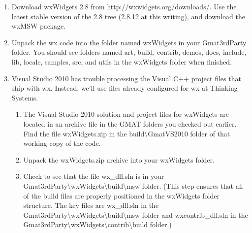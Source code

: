 \documentclass[letterpaper,10pt]{article}%
\begin{document}
\begin{enumerate}
\item Download wxWidgets 2.8 from http://wxwidgets.org/downloads/.  Use the latest stable version of the 2.8 tree (2.8.12 at this writing), and download the wxMSW package.
\item Unpack the wx code into the folder named wxWidgets in your Gmat3rdParty folder.  You should see folders named art, build, contrib, demos, docs, include, lib, locale, samples, src, and utils in the wxWidgets folder when finished.
\item Visual Studio 2010 has trouble processing the Visual C++ project files that ship with wx.  Instead, we'll use files already configured for wx at Thinking Systems.
\begin{enumerate}
\item The Visual Studio 2010 solution and project files for wxWidgets are located in an archive file in the GMAT folders you checked out earlier.  Find the file wxWidgets.zip in the build\textbackslash GmatVS2010 folder of that working copy of the code.
\item Unpack the wxWidgets.zip archive into your wxWidgets folder.
\item Check to see that the file wx\_dll.sln is in your Gmat3rdParty\textbackslash wxWidgets\textbackslash build\textbackslash msw folder.  (This step ensures that all of the build files are properly positioned in the wxWidgets folder structure.  The key files are wx\_dll.sln in the Gmat3rdParty\textbackslash wxWidgets\textbackslash build\textbackslash msw folder and wxcontrib\_dll.sln in the Gmat3rdParty\textbackslash wxWidgets\textbackslash contrib\textbackslash build folder.)
\end{enumerate}

\end{enumerate}
\end{document}
